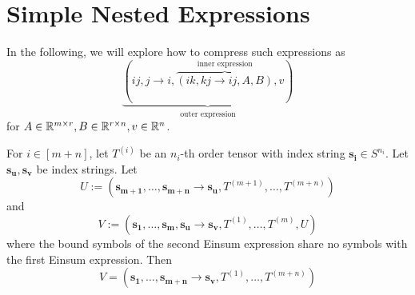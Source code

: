 \section{Simple Nested Expressions}

In the following, we will explore how to compress such expressions as
$$\underbrace{(ij, j \rightarrow i, \overbrace{(ik, kj \rightarrow ij, A, B)}^{\text{inner expression}}, v)}_{\text{outer expression}}$$
for $A \in \mathbb{R}^{m \times r}, B \in \mathbb{R}^{r \times n}, v \in \mathbb{R}^n$.

\begin{theorem}
    \label{thm:nested_einsum:simple}

    For $i \in [m + n]$, let $T^{(i)}$ be an $n_i$-th order tensor with index string $\bm{s_i} \in S^{n_i}$.
    Let $\bm{s_u}, \bm{s_v}$ be index strings.
    Let
    $$U := (\bm{s_{m + 1}},\dots,\bm{s_{m + n}} \rightarrow \bm{s_u}, T^{(m + 1)},\dots,T^{(m + n)})$$
    and
    $$V := (\bm{s_1},\dots,\bm{s_m}, \bm{s_u} \rightarrow \bm{s_v}, T^{(1)},\dots,T^{(m)}, U)$$
    where the bound symbols of the second Einsum expression share no symbols with the first Einsum expression.
    Then
    $$V = (\bm{s_1}, \dots, \bm{s_{m + n}} \rightarrow \bm{s_v}, T^{(1)}, \dots, T^{(m + n)})$$
\end{theorem}

